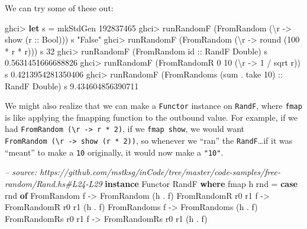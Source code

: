 \documentclass[]{article}
\newenvironment{Shaded}{}{}
\newcommand{\CommentTok}[1]{\textcolor[rgb]{0.38,0.63,0.69}{\textit{#1}}}
\newcommand{\DataTypeTok}[1]{\textcolor[rgb]{0.56,0.13,0.00}{#1}}
\newcommand{\DecValTok}[1]{\textcolor[rgb]{0.25,0.63,0.44}{#1}}
\newcommand{\FloatTok}[1]{\textcolor[rgb]{0.25,0.63,0.44}{#1}}
\newcommand{\FunctionTok}[1]{\textcolor[rgb]{0.02,0.16,0.49}{#1}}
\newcommand{\KeywordTok}[1]{\textcolor[rgb]{0.00,0.44,0.13}{\textbf{#1}}}
\newcommand{\NormalTok}[1]{#1}
\newcommand{\OtherTok}[1]{\textcolor[rgb]{0.00,0.44,0.13}{#1}}
\newcommand{\StringTok}[1]{\textcolor[rgb]{0.25,0.44,0.63}{#1}}
\begin{document}
We can try some of these out:

\begin{Shaded}
\begin{Highlighting}[]
\NormalTok{ghci}\FunctionTok{>} \KeywordTok{let}\NormalTok{ s }\FunctionTok{=}\NormalTok{ mkStdGen }\DecValTok{192837465}
\NormalTok{ghci}\FunctionTok{>}\NormalTok{ runRandomF (}\DataTypeTok{FromRandom}\NormalTok{ (\textbackslash{}r }\OtherTok{->}\NormalTok{ show (}\OtherTok{r ::} \DataTypeTok{Bool}\NormalTok{))) s}
\StringTok{"False"}
\NormalTok{ghci}\FunctionTok{>}\NormalTok{ runRandomF (}\DataTypeTok{FromRandom}\NormalTok{ (\textbackslash{}r }\OtherTok{->}\NormalTok{ round (}\DecValTok{100} \FunctionTok{*}\NormalTok{ r }\FunctionTok{*}\NormalTok{ r))) s}
\DecValTok{32}
\NormalTok{ghci}\FunctionTok{>}\NormalTok{ runRandomF (}\DataTypeTok{FromRandom}\OtherTok{ id ::} \DataTypeTok{RandF} \DataTypeTok{Double}\NormalTok{) s}
\FloatTok{0.5631451666688826}
\NormalTok{ghci}\FunctionTok{>}\NormalTok{ runRandomF (}\DataTypeTok{FromRandomR} \DecValTok{0} \DecValTok{10}\NormalTok{ (\textbackslash{}r }\OtherTok{->} \DecValTok{1} \FunctionTok{/}\NormalTok{ sqrt r)) s}
\FloatTok{0.4213954281350406}
\NormalTok{ghci}\FunctionTok{>}\NormalTok{ runRandomF (}\DataTypeTok{FromRandoms}\NormalTok{ (sum }\FunctionTok{.}\NormalTok{ take }\DecValTok{10}\NormalTok{)}\OtherTok{ ::} \DataTypeTok{RandF} \DataTypeTok{Double}\NormalTok{) s}
\FloatTok{9.434604856390711}
\end{Highlighting}
\end{Shaded}

We might also realize that we can make a \texttt{Functor} instance on
\texttt{RandF}, where \texttt{fmap} is like applying the fmapping function to
the outbound value. For example, if we had
\texttt{FromRandom\ (\textbackslash{}r\ -\textgreater{}\ r\ *\ 2)}, if we
\texttt{fmap\ show}, we would want
\texttt{FromRandom\ (\textbackslash{}r\ -\textgreater{}\ show\ (r\ *\ 2))}, so
whenever we ``ran'' the \texttt{RandF}\ldots{}if it was ``meant'' to make a
\texttt{10} originally, it would now make a \texttt{"10"}.

\begin{Shaded}
\begin{Highlighting}[]
\CommentTok{-- source: https://github.com/mstksg/inCode/tree/master/code-samples/free-random/Rand.hs#L24-L29}
\KeywordTok{instance} \DataTypeTok{Functor} \DataTypeTok{RandF} \KeywordTok{where}
\NormalTok{    fmap h rnd }\FunctionTok{=} \KeywordTok{case}\NormalTok{ rnd }\KeywordTok{of}
        \DataTypeTok{FromRandom}\NormalTok{         f }\OtherTok{->} \DataTypeTok{FromRandom}\NormalTok{         (h }\FunctionTok{.}\NormalTok{ f)}
        \DataTypeTok{FromRandomR}\NormalTok{ r0 r1  f }\OtherTok{->} \DataTypeTok{FromRandomR}\NormalTok{ r0 r1  (h }\FunctionTok{.}\NormalTok{ f)}
        \DataTypeTok{FromRandoms}\NormalTok{        f }\OtherTok{->} \DataTypeTok{FromRandoms}\NormalTok{        (h }\FunctionTok{.}\NormalTok{ f)}
        \DataTypeTok{FromRandomRs}\NormalTok{ r0 r1 f }\OtherTok{->} \DataTypeTok{FromRandomRs}\NormalTok{ r0 r1 (h }\FunctionTok{.}\NormalTok{ f)}
\end{Highlighting}
\end{Shaded}
\end{document}
